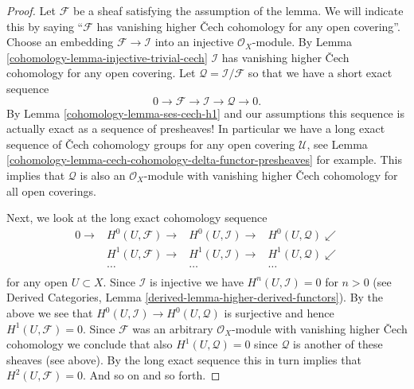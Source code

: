 \begin{proof}

Let $\mathcal{F}$ be a sheaf satisfying the assumption of the lemma.
We will indicate this by saying ``$\mathcal{F}$ has vanishing higher
{\v C}ech cohomology for any open covering''.
Choose an embedding $\mathcal{F} \to \mathcal{I}$ into an
injective $\mathcal{O}_X$-module.
By Lemma \ref{cohomology-lemma-injective-trivial-cech} $\mathcal{I}$ has vanishing higher
{\v C}ech cohomology for any open covering.
Let $\mathcal{Q} = \mathcal{I}/\mathcal{F}$
so that we have a short exact sequence
$$
0 \to \mathcal{F} \to \mathcal{I} \to \mathcal{Q} \to 0.
$$
By Lemma \ref{cohomology-lemma-ses-cech-h1} and our assumptions
this sequence is actually exact as a sequence of presheaves!
In particular we have a long exact sequence of {\v C}ech cohomology
groups for any open covering $\mathcal{U}$, see
Lemma \ref{cohomology-lemma-cech-cohomology-delta-functor-presheaves}
for example. This implies that $\mathcal{Q}$ is also an $\mathcal{O}_X$-module
with vanishing higher {\v C}ech cohomology for all open coverings.

\medskip\noindent
Next, we look at the long exact cohomology sequence
$$
\begin{array}{cccc}0 \longrightarrow & H^0(U, \mathcal{F}) \longrightarrow & H^0(U, \mathcal{I}) \longrightarrow & H^0(U, \mathcal{Q}) \swarrow \\  & H^1(U, \mathcal{F}) \longrightarrow & H^1(U, \mathcal{I}) \longrightarrow & H^1(U, \mathcal{Q}) \swarrow \\  & \ldots & \ldots & \ldots \\  &  &  & \end{array}
$$
for any open $U \subset X$. Since $\mathcal{I}$ is injective we
have $H^n(U, \mathcal{I}) = 0$ for $n > 0$ (see
Derived Categories, Lemma \ref{derived-lemma-higher-derived-functors}).
By the above we see that $H^0(U, \mathcal{I}) \to H^0(U, \mathcal{Q})$
is surjective and hence $H^1(U, \mathcal{F}) = 0$.
Since $\mathcal{F}$ was an arbitrary $\mathcal{O}_X$-module with
vanishing higher {\v C}ech cohomology we conclude that also
$H^1(U, \mathcal{Q}) = 0$ since $\mathcal{Q}$ is another of these
sheaves (see above). By the long exact sequence this in turn implies
that $H^2(U, \mathcal{F}) = 0$. And so on and so forth.
\end{proof}

